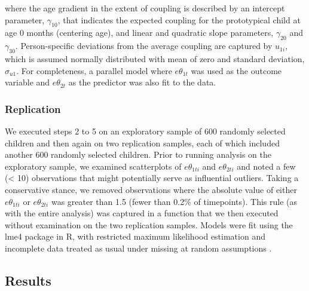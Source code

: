 \documentclass[man, floatsintext]{apa7}
\begin{document}
\noindent where the age gradient in the extent of coupling is
described by an intercept parameter, $\gamma_{10}$, that indicates the
expected coupling for the prototypical child at age 0 months (centering
age), and linear and quadratic slope parameters, $\gamma_{20}$ and
$\gamma_{30}$. Person-specific deviations from the average coupling
are captured by $u_{1i}$, which is assumed normally distributed with
mean of zero and standard deviation, $\sigma_{u1}$. For completeness,
a parallel model where $e\theta_{1t}$ was used as the outcome variable
and $e\theta_{2t}$ as the predictor was also fit to the data.

\subsubsection{Replication}

We executed steps 2 to 5 on an exploratory sample of 600 randomly selected children and then again on two replication
samples, each of which included another 600 randomly selected children. Prior to
running analysis on the exploratory sample, we examined scatterplots of
$e\theta_{1ti}$ and $e\theta_{2ti}$ and noted a few (\textless{} 10)
observations that might potentially serve as influential outliers.
Taking a conservative stance, we removed observations where the absolute
value of either $e\theta_{1ti}$ or $e\theta_{2ti}$ was greater than
1.5 (fewer than 0.2\% of timepoints). This rule (as with the entire
analysis) was captured in a function that we then executed without
examination on the two replication samples. Models were fit using the
lme4 package in R, with restricted maximum likelihood estimation and
incomplete data treated as usual under missing at random assumptions
\parencite{bates2005}.


\subsection{Results}
\end{document}
